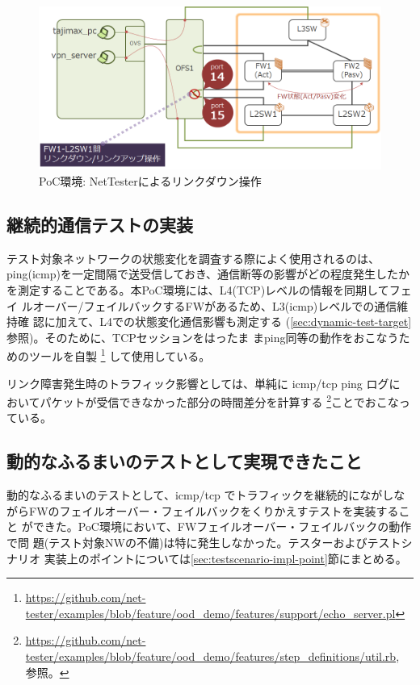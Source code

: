 \begin{figure}[h]
 \centering
 \includegraphics[scale=0.6]{img/poc-env-linkdown.png}
 \caption{PoC環境: NetTesterによるリンクダウン操作}
 \label{fig:poc-env-linkdown}
\end{figure}

  \subsection{継続的通信テストの実装}

テスト対象ネットワークの状態変化を調査する際によく使用されるのは、
ping(icmp)を一定間隔で送受信しておき、通信断等の影響がどの程度発生したか
を測定することである。本PoC環境には、L4(TCP)レベルの情報を同期してフェイ
ルオーバー/フェイルバックするFWがあるため、L3(icmp)レベルでの通信維持確
認に加えて、L4での状態変化通信影響も測定する
(\ref{sec:dynamic-test-target}参照)。そのために、TCPセッションをはったま
まping同等の動作をおこなうためのツールを自製
\footnote{\url{https://github.com/net-tester/examples/blob/feature/ood_demo/features/support/echo_server.pl}}
して使用している。

リンク障害発生時のトラフィック影響としては、単純に icmp/tcp ping ログに
おいてパケットが受信できなかった部分の時間差分を計算する
\footnote{\url{https://github.com/net-tester/examples/blob/feature/ood_demo/features/step_definitions/util.rb},
参照。}ことでおこなっている。

  \subsection{動的なふるまいのテストとして実現できたこと}

動的なふるまいのテストとして、icmp/tcp でトラフィックを継続的にながしな
がらFWのフェイルオーバー・フェイルバックをくりかえすテストを実装すること
ができた。PoC環境において、FWフェイルオーバー・フェイルバックの動作で問
題(テスト対象NWの不備)は特に発生しなかった。テスターおよびテストシナリオ
実装上のポイントについては\ref{sec:testscenario-impl-point}節にまとめる。

